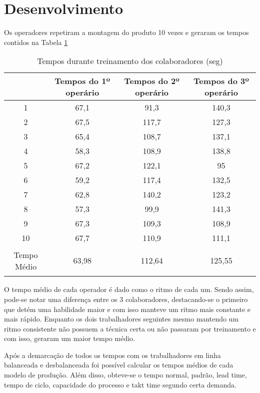 \documentclass[
	12pt,				%
	oneside,			%
	a4paper,			%
	english,			%
	french,				%
	spanish,			%
	brazil,				%
	]{abntex2}
\begin{document}
\newpage
\section[Desenvolvimento]{Desenvolvimento}
\pagestyle{fancy}


Os operadores repetiram a montagem do produto 10 vezes e geraram os tempos contidos na Tabela \ref{tab1}

\begin{table}[H]
\centering
\caption{Tempos durante treinamento dos colaboradores (seg)}
\begin{tabular}{c|c|c|c}

&Tempos do 1º operário	&		Tempos do 2º operário	&		Tempos do 3º operário		\\ \hline
1&	67,1	&		91,3	&		140,3			\\ \hline
2&	67,5	&		117,7		&	127,3			\\ \hline
3&	65,4	&		108,7		&	137,1			\\ \hline
4&	58,3	&		108,9		&	138,8			\\ \hline
5&	67,2	&		122,1		&	95			\\ \hline
6&	59,2	&		117,4		&	132,5			\\ \hline
7&	62,8	&		140,2		&	123,2			\\ \hline
8&	57,3	&		99,9		&	141,3			\\ \hline
9&	67,3	&		109,3		&	108,9			\\ \hline
10	&67,7	&		110,9		&	111,1			\\ \hline
Tempo Médio&	63,98	&		112,64	&		125,55		
	
\label{tab1}
\end{tabular}	
\end{table}
								
O tempo médio de cada operador é dado como o ritmo de cada um. Sendo assim, pode-se notar uma diferença entre os 3 colaboradores, destacando-se o primeiro que detém uma habilidade maior e com isso manteve um ritmo mais constante e mais rápido. Enquanto os dois trabalhadores seguintes mesmo mantendo um ritmo consistente não possuem a técnica certa ou não passaram por treinamento e com isso, geraram um maior tempo médio.

Após a demarcação de todos os tempos com os trabalhadores em linha balanceada e desbalanceada foi possível calcular os tempos médios de cada modelo de produção. Além disso, obteve-se o tempo normal, padrão, lead time, tempo de ciclo, capacidade do processo e takt time segundo certa demanda.
\end{document}
